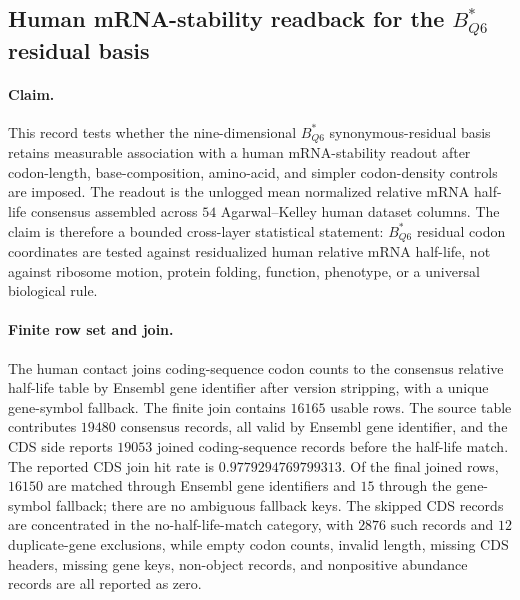 
\subsection{Human mRNA-stability readback for the $B^{\ast}_{Q6}$ residual basis}
\label{sec:bioreality-human-mrna-stability-bstar-q6}

\paragraph{Claim.}
This record tests whether the nine-dimensional $B^{\ast}_{Q6}$ synonymous-residual basis retains measurable association with a human mRNA-stability readout after codon-length, base-composition, amino-acid, and simpler codon-density controls are imposed.  The readout is the unlogged mean normalized relative mRNA half-life consensus assembled across $54$ Agarwal--Kelley human dataset columns.  The claim is therefore a bounded cross-layer statistical statement: $B^{\ast}_{Q6}$ residual codon coordinates are tested against residualized human relative mRNA half-life, not against ribosome motion, protein folding, function, phenotype, or a universal biological rule.

\paragraph{Finite row set and join.}
The human contact joins coding-sequence codon counts to the consensus relative half-life table by Ensembl gene identifier after version stripping, with a unique gene-symbol fallback.  The finite join contains $16165$ usable rows.  The source table contributes $19480$ consensus records, all valid by Ensembl gene identifier, and the CDS side reports $19053$ joined coding-sequence records before the half-life match.  The reported CDS join hit rate is $0.9779294769799313$.  Of the final joined rows, $16150$ are matched through Ensembl gene identifiers and $15$ through the gene-symbol fallback; there are no ambiguous fallback keys.  The skipped CDS records are concentrated in the no-half-life-match category, with $2876$ such records and $12$ duplicate-gene exclusions, while empty codon counts, invalid length, missing CDS headers, missing gene keys, non-object records, and nonpositive abundance records are all reported as zero.

